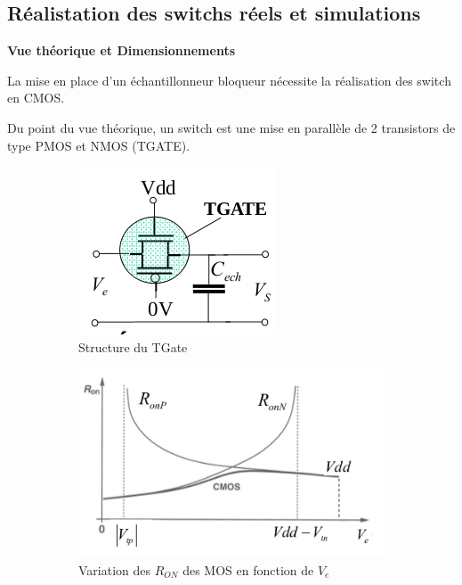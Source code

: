 \documentclass[11pt]{article}
\begin{document}
\clearpage

\subsection{R\'ealistation des switchs r\'eels et simulations}

\textbf{Vue th\'eorique et Dimensionnements}

La mise en place d'un \'echantillonneur bloqueur n\'ecessite la r\'ealisation
des switch en CMOS.

Du point du vue th\'eorique, un switch est une mise en parall\`ele de 2 transistors
de type PMOS et NMOS (TGATE).

\begin{figure}[!htb]
  \begin{subfigure}[t]{.5\linewidth}
      \centering
      \includegraphics[width=0.7\linewidth]{tgate_.png}
      \caption{Structure du TGate}
      \label{fig:sfigtgate}
  \end{subfigure}%
  \begin{subfigure}[t]{.5\linewidth}
    \centering
    \includegraphics[width=0.9\linewidth]{var_ron.png}
    \caption{Variation des $R_{ON}$ des MOS en fonction de $V_e$}
    \label{fig:sfigron}
  \end{subfigure}%
  \caption{}
  \label{fig:figswitchth}
\end{figure}
\end{document}
